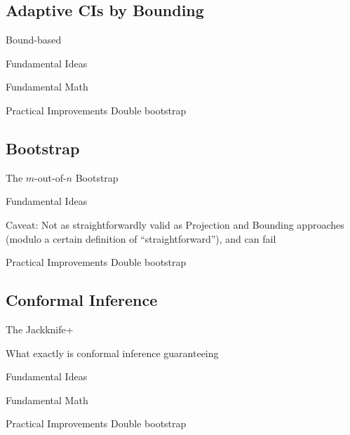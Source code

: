 \documentclass[aspectratio=169, professionalfonts]{beamer}
\begin{document}
\subsection{Adaptive CIs by Bounding}
\begin{frame}{Bound-based}
\end{frame}
\begin{frame}{Fundamental Ideas}
\end{frame}
\begin{frame}{Fundamental Math}
\end{frame}
\begin{frame}{Practical Improvements}
	Double bootstrap
\end{frame}

\subsection{\mon Bootstrap}
\begin{frame}{The $m$-out-of-$n$ Bootstrap}
\end{frame}
\begin{frame}{Fundamental Ideas}

	Caveat: Not as straightforwardly valid as Projection and Bounding approaches
	(modulo a certain definition of ``straightforward''), and can fail
	\autocite{andrews2010Asymptotic}
\end{frame}
\begin{frame}{Practical Improvements}
	Double bootstrap
\end{frame}


\subsection{Conformal Inference}
\begin{frame}{The Jackknife+}
\end{frame}
\begin{frame}{What exactly is conformal inference guaranteeing}
\end{frame}
\begin{frame}{Fundamental Ideas}
\end{frame}
\begin{frame}{Fundamental Math}
\end{frame}
\begin{frame}{Practical Improvements}
	Double bootstrap
\end{frame}
\end{document}

